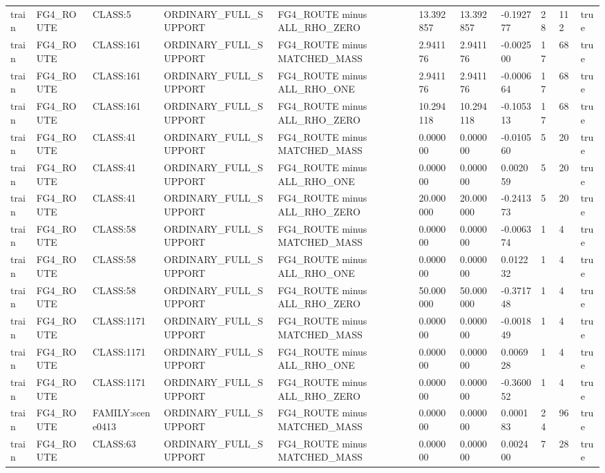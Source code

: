 \begin{tabular}{lllllllllll}
train & FG4\_ROUTE & CLASS:5 & ORDINARY\_FULL\_SUPPORT & FG4\_ROUTE minus ALL\_RHO\_ZERO & 13.392857 & 13.392857 & -0.192777 & 28 & 112 & true \\
train & FG4\_ROUTE & CLASS:161 & ORDINARY\_FULL\_SUPPORT & FG4\_ROUTE minus MATCHED\_MASS & 2.941176 & 2.941176 & -0.002500 & 17 & 68 & true \\
train & FG4\_ROUTE & CLASS:161 & ORDINARY\_FULL\_SUPPORT & FG4\_ROUTE minus ALL\_RHO\_ONE & 2.941176 & 2.941176 & -0.000664 & 17 & 68 & true \\
train & FG4\_ROUTE & CLASS:161 & ORDINARY\_FULL\_SUPPORT & FG4\_ROUTE minus ALL\_RHO\_ZERO & 10.294118 & 10.294118 & -0.105313 & 17 & 68 & true \\
train & FG4\_ROUTE & CLASS:41 & ORDINARY\_FULL\_SUPPORT & FG4\_ROUTE minus MATCHED\_MASS & 0.000000 & 0.000000 & -0.010560 & 5 & 20 & true \\
train & FG4\_ROUTE & CLASS:41 & ORDINARY\_FULL\_SUPPORT & FG4\_ROUTE minus ALL\_RHO\_ONE & 0.000000 & 0.000000 & 0.002059 & 5 & 20 & true \\
train & FG4\_ROUTE & CLASS:41 & ORDINARY\_FULL\_SUPPORT & FG4\_ROUTE minus ALL\_RHO\_ZERO & 20.000000 & 20.000000 & -0.241373 & 5 & 20 & true \\
train & FG4\_ROUTE & CLASS:58 & ORDINARY\_FULL\_SUPPORT & FG4\_ROUTE minus MATCHED\_MASS & 0.000000 & 0.000000 & -0.006374 & 1 & 4 & true \\
train & FG4\_ROUTE & CLASS:58 & ORDINARY\_FULL\_SUPPORT & FG4\_ROUTE minus ALL\_RHO\_ONE & 0.000000 & 0.000000 & 0.012232 & 1 & 4 & true \\
train & FG4\_ROUTE & CLASS:58 & ORDINARY\_FULL\_SUPPORT & FG4\_ROUTE minus ALL\_RHO\_ZERO & 50.000000 & 50.000000 & -0.371748 & 1 & 4 & true \\
train & FG4\_ROUTE & CLASS:1171 & ORDINARY\_FULL\_SUPPORT & FG4\_ROUTE minus MATCHED\_MASS & 0.000000 & 0.000000 & -0.001849 & 1 & 4 & true \\
train & FG4\_ROUTE & CLASS:1171 & ORDINARY\_FULL\_SUPPORT & FG4\_ROUTE minus ALL\_RHO\_ONE & 0.000000 & 0.000000 & 0.006928 & 1 & 4 & true \\
train & FG4\_ROUTE & CLASS:1171 & ORDINARY\_FULL\_SUPPORT & FG4\_ROUTE minus ALL\_RHO\_ZERO & 0.000000 & 0.000000 & -0.360052 & 1 & 4 & true \\
train & FG4\_ROUTE & FAMILY:scene0413 & ORDINARY\_FULL\_SUPPORT & FG4\_ROUTE minus MATCHED\_MASS & 0.000000 & 0.000000 & 0.000183 & 24 & 96 & true \\
train & FG4\_ROUTE & CLASS:63 & ORDINARY\_FULL\_SUPPORT & FG4\_ROUTE minus MATCHED\_MASS & 0.000000 & 0.000000 & 0.002400 & 7 & 28 & true \\

\end{tabular}
